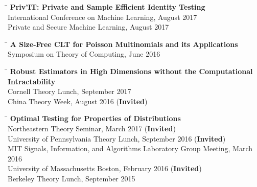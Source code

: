 \documentclass{res}
\begin{document}
\begin{resume}
\begin{tabbing}
    \hspace{0.3in}\= \kill 
    {\bf Priv'IT: Private and Sample Efficient Identity Testing} \\
    \> International Conference on Machine Learning, August 2017 \\
    \> Private and Secure Machine Learning, August 2017
    \end{tabbing}
    \vspace{-20pt}
    \begin{tabbing}
    \hspace{0.3in}\= \kill 
    {\bf A Size-Free CLT for Poisson Multinomials and its Applications} \\
    \> Symposium on Theory of Computing, June 2016
    \end{tabbing}
    \vspace{-20pt}
    \begin{tabbing}
    \hspace{0.3in}\= \kill 
    {\bf Robust Estimators in High Dimensions without the Computational Intractability} \\
    \> Cornell Theory Lunch, September 2017 \\
    \> China Theory Week, August 2016 ({\bf Invited})
    \end{tabbing}
    \vspace{-20pt}
    \begin{tabbing}
    \hspace{0.3in}\= \kill 
    {\bf Optimal Testing for Properties of Distributions} \\
    \> Northeastern Theory Seminar, March 2017 ({\bf Invited}) \\
    \> University of Pennsylvania Theory Lunch, September 2016 ({\bf Invited}) \\
    \> MIT Signals, Information, and Algorithms Laboratory Group Meeting, March 2016 \\
    \> University of Massachusetts Boston, February 2016 ({\bf Invited}) \\
    \> Berkeley Theory Lunch, September 2015
    \end{tabbing}

\end{resume}
\end{document}
